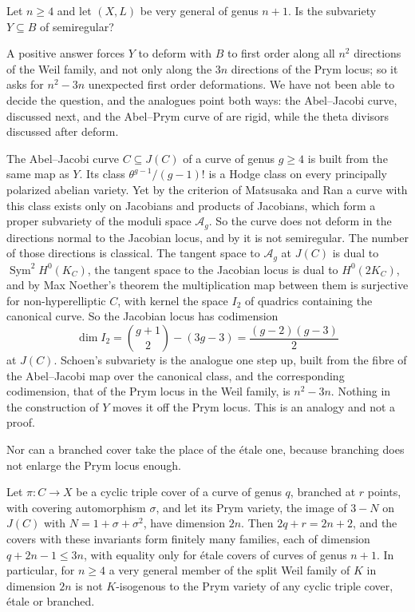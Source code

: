 \begin{question}\label{q:schoen}
Let $n\ge4$ and let $(X,L)$ be very general of genus $n+1$. Is the subvariety
$Y\subseteq B$ of  semiregular?
\end{question}

A positive answer forces $Y$ to deform with $B$ to first order along all
$n^{2}$ directions of the Weil family, and not only along the $3n$
directions of the Prym locus; so it asks for $n^{2}-3n$ unexpected first
order deformations. We have not been able to decide the question, and the
analogues point both ways: the Abel--Jacobi curve, discussed next, and the
Abel--Prym curve of  are rigid, while the theta
divisors discussed after  deform.

The Abel--Jacobi curve $C\subseteq J(C)$ of a curve of genus $g\ge4$ is
built from the same map as $Y$. Its class $\theta^{g-1}/(g-1)!$ is a Hodge
class on every principally polarized abelian variety. Yet by the criterion
of Matsusaka and Ran \cite{Mat59,Ran81} a curve with this class exists only
on Jacobians and products of Jacobians, which form a proper subvariety of the
moduli space $\mathcal{A}_{g}$. So the curve does not deform in the
directions normal to the Jacobian locus, and by  it is not
semiregular. The number of those directions is classical. The tangent space
to $\mathcal{A}_{g}$ at $J(C)$ is dual to $\operatorname{Sym}^{2}H^{0}(K_{C})$,
the tangent space to the Jacobian locus is dual to $H^{0}(2K_{C})$, and by
Max Noether's theorem the multiplication map between them is surjective for
non-hyperelliptic $C$, with kernel the space $I_{2}$ of quadrics containing
the canonical curve. So the Jacobian locus has codimension
\[
  \dim I_{2}=\binom{g+1}{2}-(3g-3)=\frac{(g-2)(g-3)}{2}
\]
at $J(C)$. Schoen's subvariety is the analogue one step up, built from the
fibre of the Abel--Jacobi map over the canonical class, and the
corresponding codimension, that of the Prym locus in the Weil family, is
$n^{2}-3n$. Nothing in the construction of $Y$ moves it off the Prym locus.
This is an analogy and not a proof.

Nor can a branched cover take the place of the \'etale one, because
branching does not enlarge the Prym locus enough.

\begin{proposition}\label{prop:branched}
Let $\pi\colon C\to X$ be a cyclic triple cover of a curve of genus $q$,
branched at $r$ points, with covering automorphism $\sigma$, and let its
Prym variety, the image of $3-N$ on $J(C)$ with $N=1+\sigma+\sigma^{2}$,
have dimension $2n$. Then $2q+r=2n+2$, and the covers with these
invariants form finitely many families, each of dimension $q+2n-1\le3n$,
with equality only for \'etale covers of curves of genus $n+1$. In
particular, for $n\ge4$ a very general member of the split Weil family of
$K$ in dimension $2n$ is not $K$-isogenous to the Prym variety of any cyclic
triple cover, \'etale or branched.
\end{proposition}

